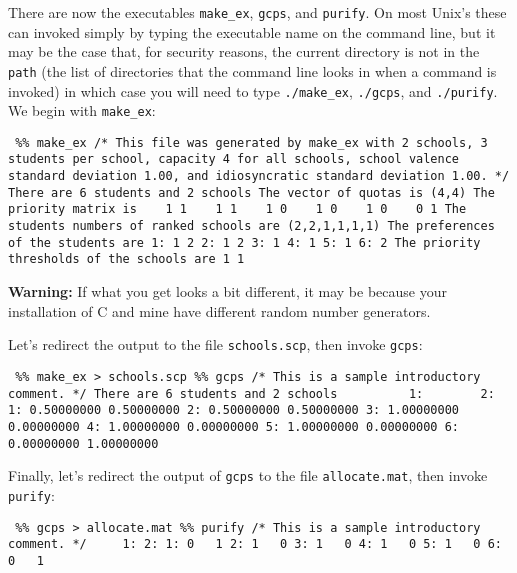 \documentclass[12pt]{article}
\theoremstyle{definition}
\begin{document}
\begin{appendix}
There are now the executables \texttt{make\_ex}, \texttt{gcps}, and
\texttt{purify}.  On most Unix's these can invoked simply by typing
the executable name on the command line, but it may be the case that,
for security reasons, the current directory is not in the
\texttt{path} (the list of directories that the command line looks in
when a command is invoked) in which case you will need to type
\texttt{./make\_ex}, \texttt{./gcps}, and \texttt{./purify}.  We begin
with \texttt{make\_ex}:
\begin{obeylines}
  \texttt{
    \%\% make\_ex
    /* This file was generated by make\_ex with 2 schools, 3 students
    per school, capacity 4 for all schools, school valence standard
    deviation 1.00, and idiosyncratic standard deviation 1.00. */
There are 6 students and 2 schools
The vector of quotas is (4,4)
The priority matrix is
\ \ \     1    1
\ \ \     1    1
\ \ \     1    0
\ \ \     1    0
\ \ \     1    0
\ \ \     0    1
The students numbers of ranked schools are
(2,2,1,1,1,1)
The preferences of the students are
1:    1   2
2:    1   2
3:    1
4:    1
5:    1
6:    2
The priority thresholds of the schools are
1   1   
    }
\end{obeylines}
\bigskip
\noindent
\textbf{Warning:} If what you get looks a bit different, it may be
because your installation of C and mine have different random number
generators.

Let's redirect the output to the file \texttt{schools.scp}, then invoke \texttt{gcps}:
\begin{obeylines}
  \texttt{
    \%\% make\_ex > schools.scp
    \%\% gcps
  /* This is a sample introductory comment. */
There are 6 students and 2 schools
\ \ \ \ \ \ \ \ \           1:   \ \ \ \ \ \ \        2:
1:   0.50000000  0.50000000
2:   0.50000000  0.50000000
3:   1.00000000  0.00000000
4:   1.00000000  0.00000000
5:   1.00000000  0.00000000
6:   0.00000000  1.00000000
  }
\end{obeylines}
\bigskip



Finally, let's redirect the output of \texttt{gcps} to the file \texttt{allocate.mat}, then invoke \texttt{purify}:
\begin{obeylines}
  \texttt{
    \%\% gcps > allocate.mat
    \%\% purify
    /* This is a sample introductory comment. */
\ \ \ \          1:   2:
   1:    0 \ \    1
   2:    1 \ \    0
   3:    1 \ \    0
   4:    1 \ \    0
   5:    1 \ \    0
   6:    0 \ \    1
  }
\end{obeylines}
\bigskip


\end{appendix}
\end{document}
